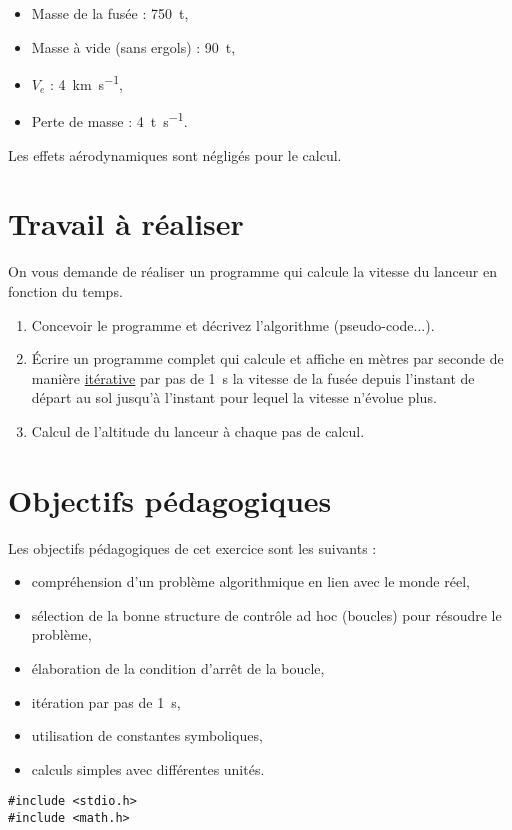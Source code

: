 \documentclass[french,a4paper,addpoints,11pt]{exam}
\begin{document}
\begin{questions}
\begin{multicols}{2}
        \begin{itemize}
            \item Masse de la fusée : \SI{750}{\tonne},
            \item Masse à vide (sans ergols) : \SI{90}{\tonne},
            \item $V_e$ : \SI{4}{\km\per\second},
            \item Perte de masse : \SI{4}{\tonne\per\second}.
        \end{itemize}

        Les effets aérodynamiques sont négligés pour le calcul.

        \section*{Travail à réaliser}

        On vous demande de réaliser un programme qui calcule la vitesse du lanceur en fonction du temps.

        \begin{enumerate}
            \item Concevoir le programme et décrivez l'algorithme (pseudo-code...).
            \item Écrire un programme complet qui calcule et affiche en mètres par seconde de manière \underline{itérative} par pas de \SI{1}{\second} la vitesse de la fusée depuis l'instant de départ au sol jusqu'à l'instant pour lequel la vitesse n'évolue plus.
            \item Calcul de l'altitude du lanceur à chaque pas de calcul.
        \end{enumerate}

        \section*{Objectifs pédagogiques}

        Les objectifs pédagogiques de cet exercice sont les suivants :

        \begin{itemize}
            \item compréhension d'un problème algorithmique en lien avec le monde réel,
            \item sélection de la bonne structure de contrôle ad hoc (boucles) pour résoudre le problème,
            \item élaboration de la condition d'arrêt de la boucle,
            \item itération par pas de \SI{1}{\second},
            \item utilisation de constantes symboliques,
            \item calculs simples avec différentes unités.
        \end{itemize}
    \end{multicols}
    \begin{solution} 
    \begin{lstlisting}
#include <stdio.h>
#include <math.h>


\end{lstlisting}
\end{solution}
\end{questions}
\end{document}
